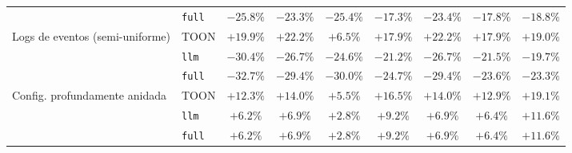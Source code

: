 \begin{table}[t]
\begin{tabular}{@{}llccccccc@{}}
     & \texttt{full} & $-25.8\%$ & $-23.3\%$ & $-25.4\%$ & $-17.3\%$ & $-23.4\%$ & $-17.8\%$ & $-18.8\%$ \\
    \cline{2-9}
    \multirow{3}{*}{Logs de eventos (semi-uniforme)} & TOON & $+19.9\%$ & $+22.2\%$ & $+6.5\%$ & $+17.9\%$ & $+22.2\%$ & $+17.9\%$ & $+19.0\%$ \\
     & \texttt{llm} & $-30.4\%$ & $-26.7\%$ & $-24.6\%$ & $-21.2\%$ & $-26.7\%$ & $-21.5\%$ & $-19.7\%$ \\
     & \texttt{full} & $-32.7\%$ & $-29.4\%$ & $-30.0\%$ & $-24.7\%$ & $-29.4\%$ & $-23.6\%$ & $-23.3\%$ \\
    \cline{2-9}
    \multirow{3}{*}{Config. profundamente anidada} & TOON & $+12.3\%$ & $+14.0\%$ & $+5.5\%$ & $+16.5\%$ & $+14.0\%$ & $+12.9\%$ & $+19.1\%$ \\
     & \texttt{llm} & $+6.2\%$ & $+6.9\%$ & $+2.8\%$ & $+9.2\%$ & $+6.9\%$ & $+6.4\%$ & $+11.6\%$ \\
     & \texttt{full} & $+6.2\%$ & $+6.9\%$ & $+2.8\%$ & $+9.2\%$ & $+6.9\%$ & $+6.4\%$ & $+11.6\%$ \\
    \bottomrule
  \end{tabular}
\end{table}

